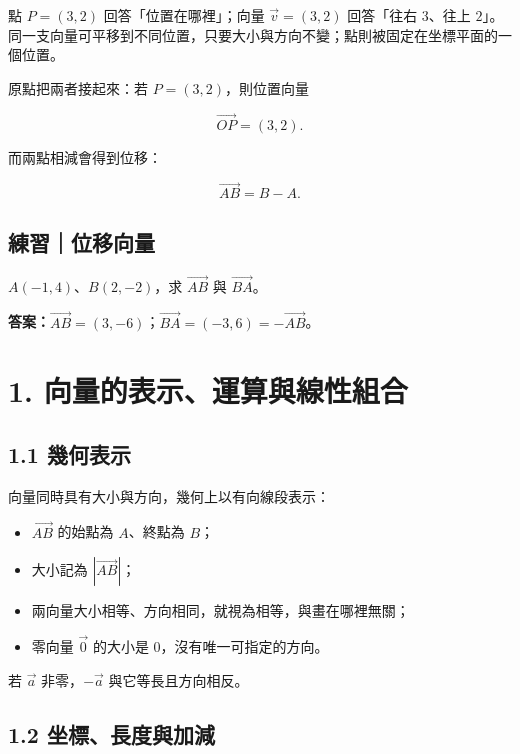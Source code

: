 \documentclass[11pt,a4paper]{article}
\providecommand{\tightlist}{%
  \setlength{\itemsep}{0pt}\setlength{\parskip}{0pt}}
\begin{document}
點 \(P=(3,2)\) 回答「位置在哪裡」；向量 \(\vec v=(3,2)\) 回答「往右 \(3\)、往上 \(2\)」。同一支向量可平移到不同位置，只要大小與方向不變；點則被固定在坐標平面的一個位置。

原點把兩者接起來：若 \(P=(3,2)\)，則位置向量

\[
\overrightarrow{OP}=(3,2).
\]

而兩點相減會得到位移：

\[
\boxed{\overrightarrow{AB}=B-A}.
\]

\begin{HandoutSelfCheck}

\subsection{練習｜位移向量}\label{ux7df4ux7fd2ux4f4dux79fbux5411ux91cf}

\(A(-1,4)\)、\(B(2,-2)\)，求 \(\overrightarrow{AB}\) 與 \(\overrightarrow{BA}\)。

\textbf{答案：}\(\overrightarrow{AB}=(3,-6)\)；\(\overrightarrow{BA}=(-3,6)=-\overrightarrow{AB}\)。

\end{HandoutSelfCheck}

\section{1. 向量的表示、運算與線性組合}\label{ux5411ux91cfux7684ux8868ux793aux904bux7b97ux8207ux7ddaux6027ux7d44ux5408}

\subsection{1.1 幾何表示}\label{ux5e7eux4f55ux8868ux793a}

向量同時具有大小與方向，幾何上以有向線段表示：

\begin{itemize}
\tightlist
\item
  \(\overrightarrow{AB}\) 的始點為 \(A\)、終點為 \(B\)；
\item
  大小記為 \(|\overrightarrow{AB}|\)；
\item
  兩向量大小相等、方向相同，就視為相等，與畫在哪裡無關；
\item
  零向量 \(\vec0\) 的大小是 \(0\)，沒有唯一可指定的方向。
\end{itemize}

若 \(\vec a\) 非零，\(-\vec a\) 與它等長且方向相反。

\subsection{1.2 坐標、長度與加減}\label{ux5750ux6a19ux9577ux5ea6ux8207ux52a0ux6e1b}
\end{document}
